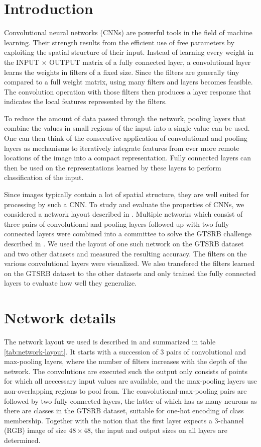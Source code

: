 \documentclass[11pt, a4paper]{article}
\begin{document}
\newpage
\section{Introduction}
Convolutional neural networks (CNNs) are powerful tools in the field of machine learning. Their strength results from the efficient use of free parameters by exploiting the spatial structure of their input. Instead of learning every weight in the INPUT $\times$ OUTPUT matrix of a fully connected layer, a convolutional layer learns the weights in filters of a fixed size. Since the filters are generally tiny compared to a full weight matrix, using many filters and layers becomes feasible. The convolution operation with those filters then produces a layer response that indicates the local features represented by the filters.

To reduce the amount of data passed through the network, pooling layers that combine the values in small regions of the input into a single value can be used. One can then think of the consecutive application of convolutional and pooling layers as mechanisms to iteratively integrate features from ever more remote locations of the image into a compact representation. Fully connected layers can then be used on the representations learned by these layers to perform classification of the input.

Since images typically contain a lot of spatial structure, they are well suited for processing by such a CNN. To study and evaluate the properties of CNNs, we considered a network layout described in \cite{multi-column-neural-network-gtsrb}. Multiple networks which consist of three pairs of convolutional and pooling layers followed up with two fully connected layers were combined into a committee to solve the GTSRB challenge described in \cite{gtsrb}. We used the layout of one such network on the GTSRB dataset and two other datasets and measured the resulting accuracy. The filters on the various convolutional layers were visualized. We also transfered the filters learned on the GTSRB dataset to the other datasets and only trained the fully connected layers to evaluate how well they generalize.

\section{Network details}
The network layout we used is described in \cite{multi-column-neural-network-gtsrb} and summarized in table \ref{tab:network-layout}. It starts with a succession of 3 pairs of convolutional and max-pooling layers, where the number of filters increases with the depth of the network. The convolutions are executed such the output only consists of points for which all neccessary input values are available, and the max-pooling layers use non-overlapping regions to pool from. The convolutional-max-pooling pairs are followed by two fully connected layers, the latter of which has as many neurons as there are classes in the GTSRB dataset, suitable for one-hot encoding of class membership. Together with the notion that the first layer expects a 3-channel (RGB) image of size $48\times48$, the input and output sizes on all layers are determined.
\end{document}
